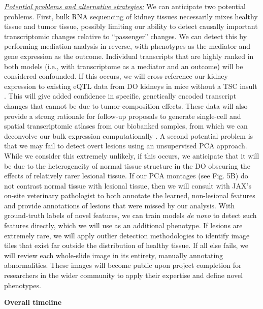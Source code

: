 \documentclass[
  12pt,
]{article}
\begin{document}
\textit{\underline{Potential problems and alternative strategies:}} We
can anticipate two potential problems. First, bulk RNA sequencing of
kidney tissues necessarily mixes healthy tissue and tumor tissue,
possibly limiting our ability to detect causally important
transcriptomic changes relative to ``passenger'' changes. We can detect
this by performing mediation analysis in reverse, with phenotypes as the
mediator and gene expression as the outcome. Individual transcripts that
are highly ranked in both models (i.e., with transcriptome as a mediator
and an outcome) will be considered confounded. If this occurs, we will
cross-reference our kidney expression to existing eQTL data from DO
kidneys in mice without a TSC insult \cite{33687326}. This will give
added confidence in specific, genetically encoded transcript changes
that cannot be due to tumor-composition effects. These data will also
provide a strong rationale for follow-up proposals to generate
single-cell and spatial transcriptomic atlases from our biobanked
samples, from which we can deconvolve our bulk expression
computationally \cite{30670690}. A second potential problem is that we
may fail to detect overt lesions using an unsupervised PCA approach.
While we consider this extremely unlikely, if this occurs, we anticipate
that it will be due to the heterogeneity of normal tissue structure in
the DO obscuring the effects of relatively rarer lesional tissue. If our
PCA montages (see Fig. 5B) do not contrast normal tissue with lesional
tissue, then we will consult with JAX's on-site veterinary pathologist
to both annotate the learned, non-lesional features and provide
annotations of lesions that were missed by our analysis. With
ground-truth labels of novel features, we can train models
\textit{de novo} to detect such features directly, which we will use as
an additional phenotype. If lesions are extremely rare, we will apply
outlier detection methodologies \cite{crammer_needle_2004} to identify
image tiles that exist far outside the distribution of healthy tissue.
If all else fails, we will review each whole-slide image in its
entirety, manually annotating abnormalities. These images will become
public upon project completion for researchers in the wider community to
apply their expertise and define novel phenotypes.

\textbf{Overall timeline}
\end{document}
